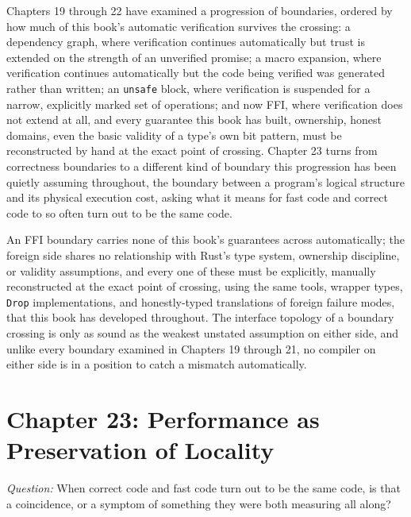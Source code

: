 \documentclass[11pt]{book}
\begin{document}
Chapters 19 through 22 have examined a progression of boundaries, ordered by how much of this book's automatic verification survives the crossing: a dependency graph, where verification continues automatically but trust is extended on the strength of an unverified promise; a macro expansion, where verification continues automatically but the code being verified was generated rather than written; an \texttt{unsafe} block, where verification is suspended for a narrow, explicitly marked set of operations; and now FFI, where verification does not extend at all, and every guarantee this book has built, ownership, honest domains, even the basic validity of a type's own bit pattern, must be reconstructed by hand at the exact point of crossing. Chapter 23 turns from correctness boundaries to a different kind of boundary this progression has been quietly assuming throughout, the boundary between a program's logical structure and its physical execution cost, asking what it means for fast code and correct code to so often turn out to be the same code.

\begin{invariantbox}
An FFI boundary carries none of this book's guarantees across automatically; the foreign side shares no relationship with Rust's type system, ownership discipline, or validity assumptions, and every one of these must be explicitly, manually reconstructed at the exact point of crossing, using the same tools, wrapper types, \texttt{Drop} implementations, and honestly-typed translations of foreign failure modes, that this book has developed throughout. The interface topology of a boundary crossing is only as sound as the weakest unstated assumption on either side, and unlike every boundary examined in Chapters 19 through 21, no compiler on either side is in a position to catch a mismatch automatically.
\end{invariantbox}

\clearpage

\chapter*{Chapter 23: Performance as Preservation of Locality}

\begin{firstprinciples}
\textit{Question:} When correct code and fast code turn out to be the same code, is that a coincidence, or a symptom of something they were both measuring all along?
\end{firstprinciples}
\end{document}
